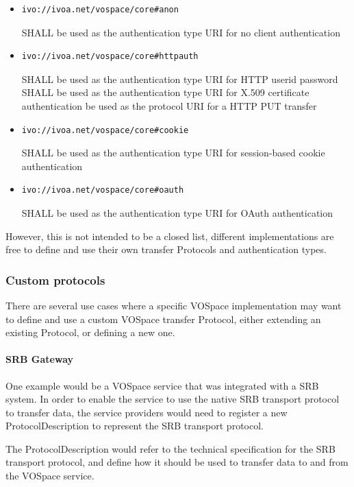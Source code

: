 \documentclass[11pt,a4paper]{ivoa}
\begin{document}
\begin{itemize}
    \item \begin{verbatim}ivo://ivoa.net/vospace/core#anon\end{verbatim} SHALL be used as the authentication type URI for no client authentication
    \item \begin{verbatim}ivo://ivoa.net/vospace/core#httpauth\end{verbatim} SHALL be used as the authentication type URI for HTTP userid password SHALL be used as the authentication type URI for X.509 certificate authentication be used as the protocol URI for a HTTP PUT transfer
    \item \begin{verbatim}ivo://ivoa.net/vospace/core#cookie\end{verbatim} SHALL be used as the authentication type URI for session-based cookie authentication
    \item \begin{verbatim}ivo://ivoa.net/vospace/core#oauth\end{verbatim} SHALL be used as the authentication type URI for OAuth authentication
\end{itemize}

However, this is not intended to be a closed list, different implementations are free to define and use their own transfer Protocols and authentication types.

\subsubsection{Custom protocols}
There are several use cases where a specific VOSpace implementation may want to define and use a custom VOSpace transfer Protocol, either extending an existing Protocol, or defining a new one.

\paragraph{SRB Gateway}
One example would be a VOSpace service that was integrated with a SRB system. In order to enable the service to use the native SRB transport protocol to transfer data, the service providers would need to register a new ProtocolDescription to represent the SRB transport protocol.

The ProtocolDescription would refer to the technical specification for the SRB transport protocol, and define how it should be used to transfer data to and from the VOSpace service.
\end{document}
